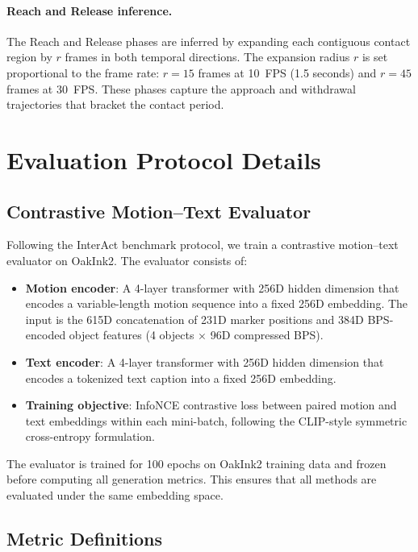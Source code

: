 \documentclass[sigconf, screen, review, anonymous]{acmart}
\begin{document}
\paragraph{Reach and Release inference.}
The Reach and Release phases are inferred by expanding each contiguous contact region by $r$ frames in both temporal directions. The expansion radius $r$ is set proportional to the frame rate: $r = 15$ frames at 10~FPS (1.5 seconds) and $r = 45$ frames at 30~FPS. These phases capture the approach and withdrawal trajectories that bracket the contact period.


\section{Evaluation Protocol Details}
\label{sec:eval_protocol}

\subsection{Contrastive Motion--Text Evaluator}

Following the InterAct benchmark protocol, we train a contrastive motion--text evaluator on OakInk2. The evaluator consists of:

\begin{itemize}
  \item \textbf{Motion encoder}: A 4-layer transformer with 256D hidden dimension that encodes a variable-length motion sequence into a fixed 256D embedding. The input is the 615D concatenation of 231D marker positions and 384D BPS-encoded object features (4 objects $\times$ 96D compressed BPS).
  \item \textbf{Text encoder}: A 4-layer transformer with 256D hidden dimension that encodes a tokenized text caption into a fixed 256D embedding.
  \item \textbf{Training objective}: InfoNCE contrastive loss between paired motion and text embeddings within each mini-batch, following the CLIP-style symmetric cross-entropy formulation.
\end{itemize}

The evaluator is trained for 100 epochs on OakInk2 training data and frozen before computing all generation metrics. This ensures that all methods are evaluated under the same embedding space.

\subsection{Metric Definitions}
\end{document}
